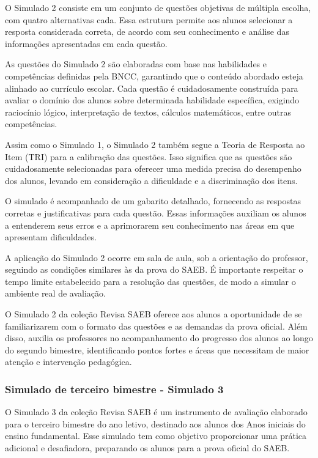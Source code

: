 O Simulado 2 consiste em um conjunto de questões objetivas de múltipla
escolha, com quatro alternativas cada. Essa estrutura permite aos alunos
selecionar a resposta considerada correta, de acordo com seu
conhecimento e análise das informações apresentadas em cada questão.

As questões do Simulado 2 são elaboradas com base nas habilidades e
competências definidas pela BNCC, garantindo que o conteúdo abordado
esteja alinhado ao currículo escolar. Cada questão é cuidadosamente
construída para avaliar o domínio dos alunos sobre determinada
habilidade específica, exigindo raciocínio lógico, interpretação de
textos, cálculos matemáticos, entre outras competências.

Assim como o Simulado 1, o Simulado 2 também segue a Teoria de Resposta
ao Item (TRI) para a calibração das questões. Isso significa que as
questões são cuidadosamente selecionadas para oferecer uma medida
precisa do desempenho dos alunos, levando em consideração a dificuldade
e a discriminação dos itens.

O simulado é acompanhado de um gabarito detalhado, fornecendo as
respostas corretas e justificativas para cada questão. Essas informações
auxiliam os alunos a entenderem seus erros e a aprimorarem seu
conhecimento nas áreas em que apresentam dificuldades.

A aplicação do Simulado 2 ocorre em sala de aula, sob a orientação do
professor, seguindo as condições similares às da prova do SAEB. É
importante respeitar o tempo limite estabelecido para a resolução das
questões, de modo a simular o ambiente real de avaliação.

O Simulado 2 da coleção Revisa SAEB oferece aos alunos a oportunidade de se
familiarizarem com o formato das questões e as demandas da prova
oficial. Além disso, auxilia os professores no acompanhamento do
progresso dos alunos ao longo do segundo bimestre, identificando pontos
fortes e áreas que necessitam de maior atenção e intervenção pedagógica.

\subsubsection{Simulado de terceiro bimestre - Simulado
3}\label{simulado-de-terceiro-bimestre---simulado-3}

O Simulado 3 da coleção Revisa SAEB é um instrumento de avaliação elaborado para o
terceiro bimestre do ano letivo, destinado aos alunos dos Anos iniciais
do ensino fundamental. Esse simulado tem como objetivo proporcionar uma
prática adicional e desafiadora, preparando os alunos para a prova
oficial do SAEB.

